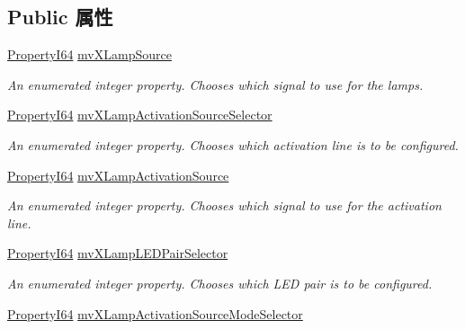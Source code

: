 \subsection*{Public 属性}
\begin{DoxyCompactItemize}
\item 
\hyperlink{group___common_interface_ga81749b2696755513663492664a18a893}{Property\+I64} \hyperlink{classmv_i_m_p_a_c_t_1_1acquire_1_1_gen_i_cam_1_1mv_x_lamp_control_ab98091804bbf306399046be4543ebb48}{mv\+X\+Lamp\+Source}
\begin{DoxyCompactList}\small\item\em An enumerated integer property. Chooses which signal to use for the lamps. \end{DoxyCompactList}\item 
\hyperlink{group___common_interface_ga81749b2696755513663492664a18a893}{Property\+I64} \hyperlink{classmv_i_m_p_a_c_t_1_1acquire_1_1_gen_i_cam_1_1mv_x_lamp_control_a46951da0aeda74f3f59b561078b965a8}{mv\+X\+Lamp\+Activation\+Source\+Selector}
\begin{DoxyCompactList}\small\item\em An enumerated integer property. Chooses which activation line is to be configured. \end{DoxyCompactList}\item 
\hyperlink{group___common_interface_ga81749b2696755513663492664a18a893}{Property\+I64} \hyperlink{classmv_i_m_p_a_c_t_1_1acquire_1_1_gen_i_cam_1_1mv_x_lamp_control_a056ba745427e59e1332327c277b89d54}{mv\+X\+Lamp\+Activation\+Source}
\begin{DoxyCompactList}\small\item\em An enumerated integer property. Chooses which signal to use for the activation line. \end{DoxyCompactList}\item 
\hyperlink{group___common_interface_ga81749b2696755513663492664a18a893}{Property\+I64} \hyperlink{classmv_i_m_p_a_c_t_1_1acquire_1_1_gen_i_cam_1_1mv_x_lamp_control_a0fd6dbe59fe73c3a0006f2f814488ad8}{mv\+X\+Lamp\+L\+E\+D\+Pair\+Selector}
\begin{DoxyCompactList}\small\item\em An enumerated integer property. Chooses which L\+E\+D pair is to be configured. \end{DoxyCompactList}\item 
\hyperlink{group___common_interface_ga81749b2696755513663492664a18a893}{Property\+I64} \hyperlink{classmv_i_m_p_a_c_t_1_1acquire_1_1_gen_i_cam_1_1mv_x_lamp_control_af9b2572ee8f81479c9638110d1b59a8e}{mv\+X\+Lamp\+Activation\+Source\+Mode\+Selector}

\end{DoxyCompactItemize}
